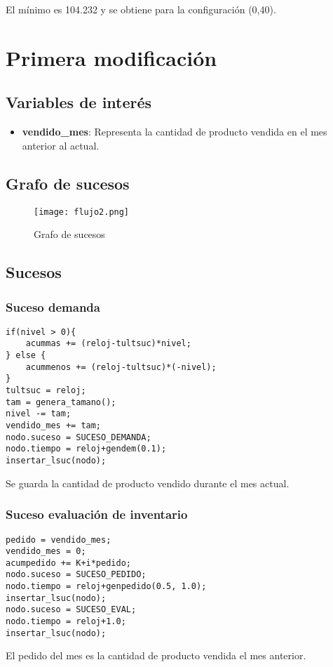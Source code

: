 El mínimo es 104.232 y se obtiene para la configuración (0,40).

\section{Primera modificación}
\subsection{Variables de interés}
\begin{itemize}
	\item \textbf{vendido\_mes}: Representa la cantidad de producto vendida en el mes anterior al actual.
\end{itemize}
\subsection{Grafo de sucesos}
\begin{figure}[H]
	\centering
	\texttt{[image: flujo2.png]}
	\caption{Grafo de sucesos}
\end{figure}

\subsection{Sucesos}
\subsubsection{Suceso demanda}

\begin{verbatim}
if(nivel > 0){
	acummas += (reloj-tultsuc)*nivel;
} else {
	acummenos += (reloj-tultsuc)*(-nivel);
}
tultsuc = reloj;
tam = genera_tamano();
nivel -= tam;
vendido_mes += tam;
nodo.suceso = SUCESO_DEMANDA;
nodo.tiempo = reloj+gendem(0.1);
insertar_lsuc(nodo);
\end{verbatim}
Se guarda la cantidad de producto vendido durante el mes actual.

\newpage

\subsubsection{Suceso evaluación de inventario}
\begin{verbatim}
pedido = vendido_mes;
vendido_mes = 0;
acumpedido += K+i*pedido;
nodo.suceso = SUCESO_PEDIDO;
nodo.tiempo = reloj+genpedido(0.5, 1.0);
insertar_lsuc(nodo);
nodo.suceso = SUCESO_EVAL;
nodo.tiempo = reloj+1.0;
insertar_lsuc(nodo);
\end{verbatim}
El pedido del mes es la cantidad de producto vendida el mes anterior.

